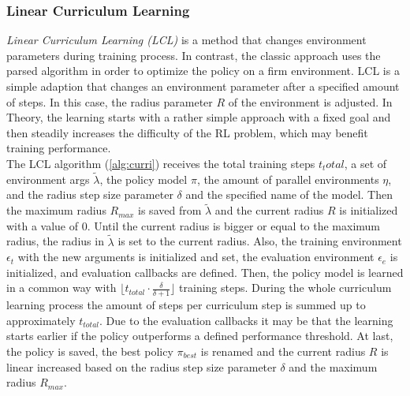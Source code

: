\subsubsection{Linear Curriculum Learning}
\emph{Linear Curriculum Learning (LCL)} is a method that changes environment parameters during training process. 
In contrast, the classic approach uses the parsed algorithm in order to optimize the policy on a firm environment. 
LCL is a simple adaption that changes an environment parameter after a specified amount of steps. 
In this case, the radius parameter $R$ of the environment is adjusted. 
In Theory, the learning starts with a rather simple approach with a fixed goal and then steadily increases the difficulty of the RL problem, 
which may benefit training performance.\\
The LCL algorithm (\cref{alg:curri}) receives the total training steps $t_total$, a set of environment args $\tilde{\lambda}$, 
the policy model $\pi$, the amount of parallel environments $\eta$, and the radius step size parameter $\delta$ and the specified name of the model.
Then the maximum radius $R_{max}$ is saved from $\tilde{\lambda}$ and the current radius $R$ is initialized with a value of $0$.
Until the current radius is bigger or equal to the maximum radius, 
the radius in $\tilde{\lambda}$ is set to the current radius. 
Also, the training environment $\epsilon_t$ with the new arguments is initialized and set, 
the evaluation environment $\epsilon_e$ is initialized, and evaluation callbacks are defined. 
Then, the policy model is learned in a common way with $\lfloor t_{total} \cdot \frac{\delta}{\delta + 1} \rfloor$ training steps. 
During the whole curriculum learning process the amount of steps per curriculum step is summed up to approximately $t_{total}$.
Due to the evaluation callbacks it may be that the learning starts earlier if the policy outperforms a defined performance threshold. 
At last, the policy is saved, the best policy $\pi_{best}$ is renamed and the current radius $R$ is linear increased based 
on the radius step size parameter $\delta$ and the maximum radius $R_{max}$.

\newpage


